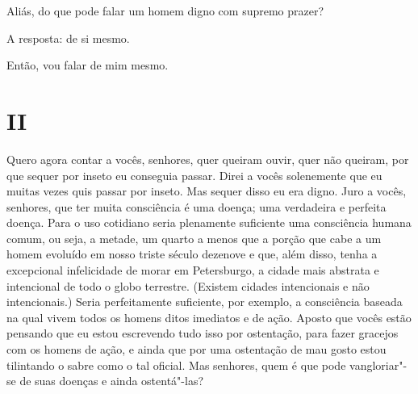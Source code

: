 Aliás, do que pode falar um homem digno com supremo prazer?

A resposta: de si mesmo.

Então, vou falar de mim mesmo.


\section{II}

Quero agora contar a vocês, senhores, quer queiram ouvir, quer não
queiram, por que sequer por inseto eu conseguia passar. Direi a vocês
solenemente que eu muitas vezes quis passar por inseto. Mas sequer
disso eu era digno. Juro a vocês, senhores, que ter muita consciência é
uma doença; uma verdadeira e perfeita doença. Para o uso cotidiano
seria plenamente suficiente uma consciência humana comum, ou seja, a
metade, um quarto a menos que a porção que cabe a um homem evoluído em
nosso triste século dezenove e que, além disso, tenha a excepcional
infelicidade de morar em Petersburgo, a cidade mais abstrata e
intencional de todo o globo terrestre. (Existem cidades intencionais e
não intencionais.) Seria perfeitamente suficiente, por exemplo, a
consciência baseada na qual vivem todos os homens ditos imediatos e de
ação. Aposto que vocês estão pensando que eu estou escrevendo tudo isso
por ostentação, para fazer gracejos com os homens de ação, e ainda que
por uma ostentação de mau gosto estou tilintando o sabre como o tal
oficial. Mas senhores, quem é que pode vangloriar"-se de suas doenças e
ainda ostentá"-las?


